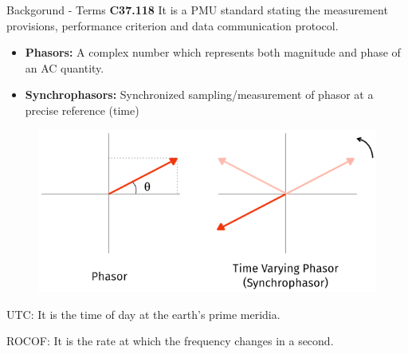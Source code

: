 \documentclass{beamer}
\begin{document}
 
 
     \begin{frame}{Backgorund - Terms}
   	 \textbf{C37.118} It is a PMU standard stating the measurement provisions, performance criterion and data communication protocol.
   	 \begin{center}
		\begin{itemize}
		\item \textbf{Phasors:} A complex number which represents both magnitude and phase of an AC quantity.
		\item \textbf{Synchrophasors:} Synchronized sampling/measurement of phasor at a precise reference (time)
		\end{itemize}
		\begin{figure}
		\includegraphics*[scale=0.5]{Phasors.png}
		\end{figure}
		\item UTC: It is the time of day at the earth's prime meridia.
		\item ROCOF: It is the rate at which the frequency changes in a second.
		
   	 \end{center}
     \end{frame}
 
\end{document}
